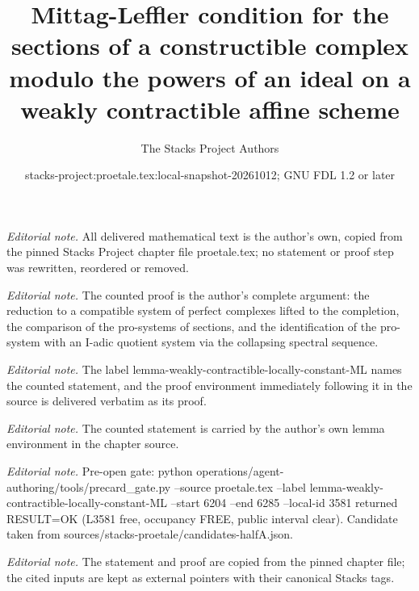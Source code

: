 \documentclass[10pt,a4paper]{amsart}
\title{Mittag-Leffler condition for the sections of a constructible complex modulo the powers of an ideal on a weakly contractible affine scheme}
\author{The Stacks Project Authors}
\date{stacks-project:proetale.tex:local-snapshot-20261012; GNU FDL 1.2 or later}
\theoremstyle{plain}
\theoremstyle{definition}
\theoremstyle{remark}
\numberwithin{equation}{subsection}
\begin{document}
\maketitle
\noindent\textit{Editorial note.} All delivered mathematical text is the author's own, copied from the pinned Stacks Project chapter file proetale.tex; no statement or proof step was rewritten, reordered or removed.\par\medskip
\noindent\textit{Editorial note.} The counted proof is the author's complete argument: the reduction to a compatible system of perfect complexes lifted to the completion, the comparison of the pro-systems of sections, and the identification of the pro-system with an I-adic quotient system via the collapsing spectral sequence.\par\medskip
\noindent\textit{Editorial note.} The label lemma-weakly-contractible-locally-constant-ML names the counted statement, and the proof environment immediately following it in the source is delivered verbatim as its proof.\par\medskip
\noindent\textit{Editorial note.} The counted statement is carried by the author's own lemma environment in the chapter source.\par\medskip
\noindent\textit{Editorial note.} Pre-open gate: python operations/agent-authoring/tools/precard\_gate.py --source proetale.tex --label lemma-weakly-contractible-locally-constant-ML --start 6204 --end 6285 --local-id 3581 returned RESULT=OK (L3581 free, occupancy FREE, public interval clear). Candidate taken from sources/stacks-proetale/candidates-halfA.json.\par\medskip
\noindent\textit{Editorial note.} The statement and proof are copied from the pinned chapter file; the cited inputs are kept as external pointers with their canonical Stacks tags.\par\medskip
\end{document}
